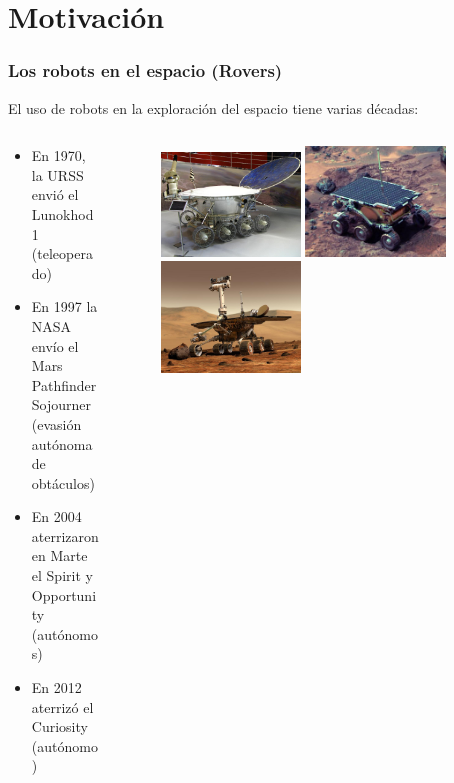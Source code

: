 \documentclass[10pt,spanish,aspectratio=1610]{beamer}
\begin{document}
\section{Motivación}
\begin{frame}\frametitle{Los robots en el espacio (Rovers)}
  El uso de robots en la exploración del espacio tiene varias décadas\cite{ellery2016survey}:
  \begin{columns}
    \begin{column}{0.5\textwidth}
      \begin{itemize}
      \item En 1970, la URSS envió el Lunokhod 1 (teleoperado)
      \item En 1997 la NASA envío el Mars Pathfinder Sojourner (evasión autónoma de obtáculos)
      \item En 2004 aterrizaron en Marte el Spirit y Opportunity (autónomos)
      \item En 2012 aterrizó el Curiosity (autónomo)
      \end{itemize}
    \end{column}
    \begin{column}{0.5\textwidth}
      \begin{figure}
        \centering
        \includegraphics[width=0.45\textwidth]{Figures/RoverLunokhod1.jpg}
        \includegraphics[width=0.45\textwidth]{Figures/RoverSojourner.jpg}
        \includegraphics[width=0.45\textwidth]{Figures/RoverOpportunity.jpg}

\end{figure}
\end{column}
\end{columns}
\end{frame}
\end{document}
